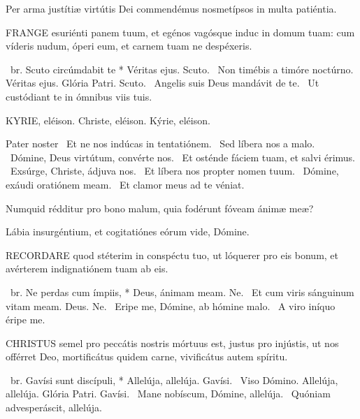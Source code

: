  Per arma justítiæ virtútis Dei commendémus nosmetípsos in multa patiéntia.


\lettrine[lines=2]{F}{RANGE} esuriénti panem tuum, et egénos vagósque induc in domum tuam: cum víderis nudum, óperi eum, et carnem tuam ne despéxeris.

\R\ br. Scuto circúmdabit te * Véritas ejus. Scuto. \V\ Non timébis a timóre noctúrno. Véritas ejus. Glória Patri. Scuto. \V\ Angelis suis Deus mandávit de te. \R\ Ut custódiant te in ómnibus viis tuis.


KYRIE, eléison. Christe, eléison. Kýrie, eléison.

Pater noster  \V\ Et ne nos indúcas in tentatiónem. \R\ Sed líbera nos a malo. \V\ Dómine, Deus virtútum, convérte nos. \R\ Et osténde fáciem tuam, et salvi érimus. \V\ Exsúrge, Christe, ádjuva nos. \R\ Et líbera nos propter nomen tuum. \V\ Dómine, exáudi oratiónem meam. \R\ Et clamor meus ad te véniat.



 Numquid rédditur pro bono malum, quia fodérunt fóveam ánimæ meæ?


 Lábia insurgéntium, et cogitatiónes eórum vide, Dómine.


\lettrine[lines=2]{R}{ECORDARE} quod stéterim in conspéctu tuo, ut lóquerer pro eis bonum, et avérterem indignatiónem tuam ab eis.

\R\ br. Ne perdas cum ímpiis, * Deus, ánimam meam. Ne. \V\ Et cum viris sánguinum vitam meam. Deus. Ne. \V\ Eripe me, Dómine, ab hómine malo. \R\ A viro iníquo éripe me.




\lettrine[lines=2]{C}{HRISTUS} semel pro peccátis nostris mórtuus est, justus pro injústis, ut nos offérret Deo, mortificátus quidem carne, vivificátus autem spíritu.

\R\ br. Gavísi sunt discípuli, * Allelúja, allelúja. Gavísi. \V\ Viso Dómino. Allelúja, allelúja. Glória Patri. Gavísi. \V\ Mane nobíscum, Dómine, allelúja. \R\ Quóniam advesperáscit, allelúja.


